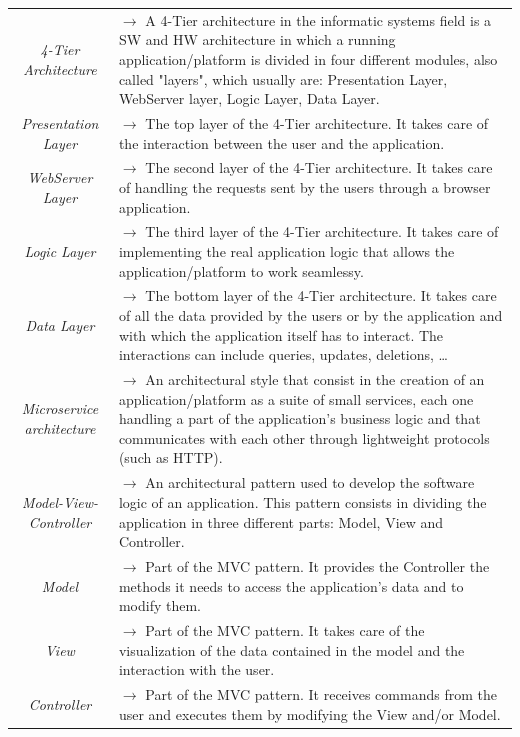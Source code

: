 \documentclass{article}
\begin{document}
{\begin{xltabular}{\textwidth}{ >{\raggedright\arraybackslash}c >{\raggedright\arraybackslash}X }
    \textit{4-Tier Architecture} & $\rightarrow$ A 4-Tier architecture in the informatic systems field
    is a SW and HW architecture in which a running application/platform is divided in four 
    different modules, also called "layers", which usually are: Presentation Layer, WebServer 
    layer, Logic Layer, Data Layer. \\
    \textit{Presentation Layer} & $\rightarrow$ The top layer of the 4-Tier architecture. It 
    takes care of the interaction between the user and the application.\\
    \textit{WebServer Layer} & $\rightarrow$ The second layer of the 4-Tier architecture. It 
    takes care of handling the requests sent by the users through a browser application. \\
    \textit{Logic Layer} & $\rightarrow$ The third layer of the 4-Tier architecture. It takes 
    care of implementing the real application logic that allows the application/platform to 
    work seamlessy. \\
    \textit{Data Layer} & $\rightarrow$ The bottom layer of the 4-Tier architecture. It takes 
    care of all the data provided by the users or by the application and with which the 
    application itself has to interact. The interactions can include queries, updates, deletions, \dots \\
    \textit{Microservice architecture} & $\rightarrow$ An architectural style that consist in the 
    creation of an application/platform as a suite of small services, each one handling a part 
    of the application's business logic and that communicates with each other through 
    lightweight protocols (such as HTTP). \\
    \textit{Model-View-Controller} & $\rightarrow$ An architectural pattern used to develop the
    software logic of an application. This pattern consists in dividing the application in three
    different parts: Model, View and Controller. \\
    \textit{Model} & $\rightarrow$ Part of the MVC pattern. It provides the Controller the
    methods it needs to access the application's data and to modify them. \\
    \textit{View} & $\rightarrow$ Part of the MVC pattern. It takes care of the visualization of the
    data contained in the model and the interaction with the user. \\
    \textit{Controller} & $\rightarrow$ Part of the MVC pattern. It receives commands from the user and executes them
    by modifying the View and/or Model. \\

\end{xltabular}}
\end{document}
